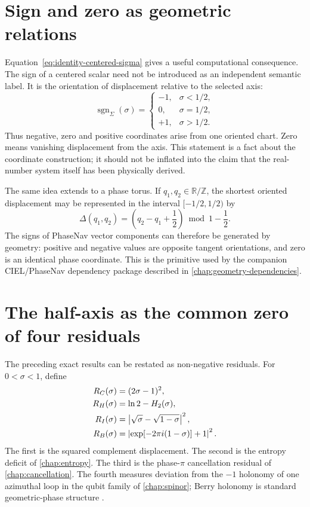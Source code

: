 \section{Sign and zero as geometric relations}

Equation~\eqref{eq:identity-centered-sigma} gives a useful computational
consequence.  The sign of a centered scalar need not be introduced as an
independent semantic label.  It is the orientation of displacement relative to
the selected axis:
\begin{equation}
 \operatorname{sgn}_{\Sigma}(\sigma)
 =
 \begin{cases}
 -1,&\sigma<1/2,\\
 0,&\sigma=1/2,\\
 +1,&\sigma>1/2.
 \end{cases}
 \label{eq:identity-sign}
\end{equation}
Thus negative, zero and positive coordinates arise from one oriented chart.
Zero means vanishing displacement from the axis.  This statement is a fact
about the coordinate construction; it should not be inflated into the claim
that the real-number system itself has been physically derived.

The same idea extends to a phase torus.  If $q_1,q_2\in\mathbb R/\mathbb Z$,
the shortest oriented displacement may be represented in the interval
$[-1/2,1/2)$ by
\begin{equation}
 \Delta(q_1,q_2)
 =\left(q_2-q_1+\frac12\right)\bmod1-\frac12.
 \label{eq:shortest-turn-displacement}
\end{equation}
The signs of PhaseNav vector components can therefore be generated by geometry:
positive and negative values are opposite tangent orientations, and zero is an
identical phase coordinate.  This is the primitive used by the companion
CIEL/PhaseNav dependency package described in \cref{chap:geometry-dependencies}.

\section{The half-axis as the common zero of four residuals}

The preceding exact results can be restated as non-negative residuals.  For
$0<\sigma<1$, define
\begin{align}
 R_C(\sigma)
 &= (2\sigma-1)^2,\label{eq:residual-complement}\\
 R_H(\sigma)
 &= \ln2-H_2(\sigma),\label{eq:residual-entropy}\\
 R_I(\sigma)
 &= \left|\sqrt\sigma-\sqrt{1-\sigma}\right|^2,\label{eq:residual-interference}\\
 R_B(\sigma)
 &= \left|\exp[-2\pi i(1-\sigma)]+1\right|^2.
 \label{eq:residual-berry}
\end{align}
The first is the squared complement displacement.  The second is the entropy
deficit of \cref{chap:entropy}.  The third is the phase-$\pi$ cancellation
residual of \cref{chap:cancellation}.  The fourth measures deviation from the
$-1$ holonomy of one azimuthal loop in the qubit family of
\cref{chap:spinor}; Berry holonomy is standard geometric-phase structure
\citep{berry1984,simon1983}.


